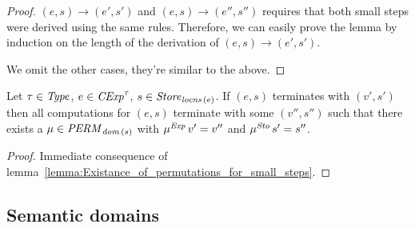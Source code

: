 \documentclass[12pt,a4paper]{report}
\newcommand{\CExp}{\nstyle{CExp}}
\newcommand{\Sto}{\nstyle{Sto}}
\newcommand{\PERM}{\nstyle{PERM}}
\begin{document}
\begin{proof}
  $(e,s) \to (e',s')$ and $(e,s) \to (e'',s'')$ requires that both small steps were derived
  using the same rules. Therefore, we can easily prove the lemma by induction on the length
  of the derivation of $(e,s) \to (e',s')$.
  We omit the other cases, they're similar to the above.
\end{proof}

\begin{corollary}
  Let $\tau\in\mathit{Type}$, $e\in\CExp^\tau$, $s\in\mathit{Store}_{\mathit{locns}\,(e)}$.
  If $(e,s)$ terminates with $(v',s')$ then all computations for $(e,s)$ terminate with some
  $(v'',s'')$ such that there exists a $\mu \in \PERM_{\dom{s}}$ with
  $\mu^{\mathit{Exp}}\,v' = v''$ and $\mu^\Sto\,s' = s''$.
\end{corollary}

\begin{proof}
  Immediate consequence of lemma~\ref{lemma:Existance_of_permutations_for_small_steps}.
\end{proof}



\subsection{Semantic domains}
\end{document}

